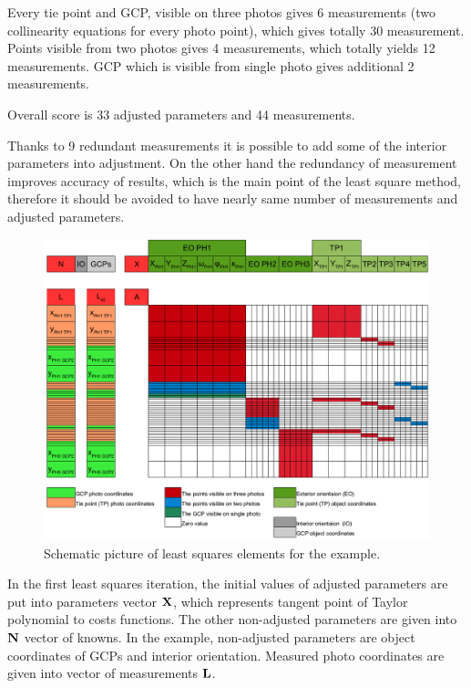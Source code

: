 \documentclass[a4paper,12pt]{article}
\newcommand{\evect}[1]{
{\bf #1}
}
\begin{document}
Every tie point and GCP, visible on three photos gives 6 measurements (two collinearity equations for every photo point),
which gives totally 30 measurement.
Points visible from two photos gives 4 measurements, which totally yields 12 measurements.
GCP which is visible from single photo gives additional 2 measurements.

Overall score is 33 adjusted parameters and 44 measurements.

Thanks to 9 redundant measurements it is possible to add some of the interior parameters into adjustment.  
On the other hand the redundancy of measurement improves accuracy of results, which is the main point of the least square method,
therefore it should be avoided to have nearly same number of measurements and adjusted parameters.


\begin{figure}[h]
    \hspace*{-1.0in}
   \includegraphics[scale=0.47]{figures/bba_system.png}
    \caption{Schematic picture of least squares elements for the example.}
    \label{fig:bba_system}
\end{figure}



In the first least squares iteration, the initial values of adjusted parameters are put into parameters vector $\evect{X}$,
which represents tangent point of Taylor polynomial to costs functions.  The other non-adjusted 
parameters are given into $\evect{N}$ vector of knowns. In the example, non-adjusted parameters are object coordinates
of GCPs and interior orientation. 
Measured photo coordinates are given
into vector of measurements $\evect{L}$.
\end{document}
